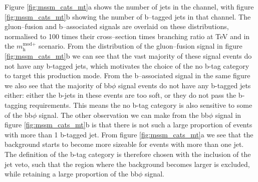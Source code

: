 Figure \ref{fig:mssm_cats_mt}a shows the number of jets 
in the \mutau channel, with figure \ref{fig:mssm_cats_mt}b showing
the number of b--tagged jets in that channel. The gluon--fusion
and b--associated signals are overlaid on these distributions, normalised
to 100 times their cross--section times branching ratio at  TeV and 
 in the $m_{\text{h}}^{\text{mod+}}$ scenario. From the distribution of the
gluon--fusion signal in figure \ref{fig:mssm_cats_mt}b we can 
see that the vast majority of these signal events do not have any b-tagged jets, which
motivates the choice of the no b-tag category to target this production mode. From
the b--associated signal in the same figure we also see that the majority of bb$\phi$
signal events do not have any b-tagged jets either: either the b-jets in these events 
are too soft, or they do not pass the b-tagging requirements. This means the no b-tag 
category is also sensitive to some of the bb$\phi$ signal. The other observation we 
can make from the bb$\phi$ signal in figure \ref{fig:mssm_cats_mt}b is that there is not
such a large proportion of events with more than 1 b-tagged jet. From figure \ref{fig:mssm_cats_mt}a
we see that the \ttbar background starts to become more sizeable for events with more than
one jet. The definition of the b-tag category is therefore chosen with the inclusion
of the jet veto, such that the region where the \ttbar background becomes larger is excluded, 
while retaining a large proportion of the bb$\phi$ signal.

